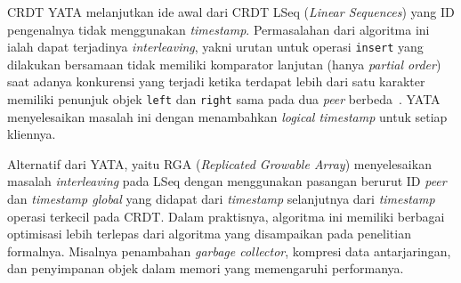 CRDT YATA melanjutkan ide awal dari CRDT LSeq (\textit{Linear Sequences}) yang ID pengenalnya tidak menggunakan \textit{timestamp}. Permasalahan dari algoritma ini ialah dapat terjadinya \textit{interleaving}, yakni urutan untuk operasi \texttt{insert} yang dilakukan bersamaan tidak memiliki komparator lanjutan (hanya \textit{partial order}) saat adanya konkurensi yang terjadi ketika terdapat lebih dari satu karakter memiliki penunjuk objek \texttt{left} dan \texttt{right} sama pada dua \textit{peer} berbeda~\citep{kleppmann2019interleaving, nedelec2013lseq}. YATA menyelesaikan masalah ini dengan menambahkan \textit{logical timestamp} untuk setiap kliennya.

Alternatif dari YATA, yaitu RGA (\textit{Replicated Growable Array}) menyelesaikan masalah \textit{interleaving} pada LSeq dengan menggunakan pasangan berurut ID \textit{peer} dan \textit{timestamp global} yang didapat dari \textit{timestamp} selanjutnya dari \textit{timestamp} operasi terkecil pada CRDT. Dalam praktisnya, algoritma ini memiliki berbagai optimisasi lebih terlepas dari algoritma yang disampaikan pada penelitian formalnya. Misalnya penambahan \textit{garbage collector}, kompresi data antarjaringan, dan penyimpanan objek dalam memori yang memengaruhi performanya.